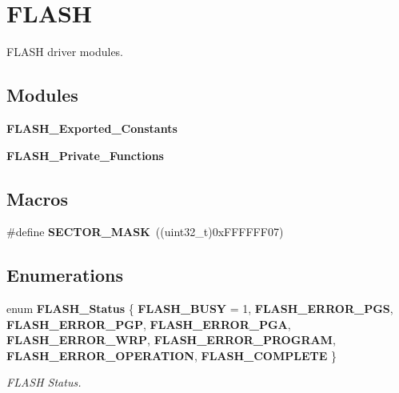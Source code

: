 \section{F\+L\+A\+SH}
\label{group__FLASH}


F\+L\+A\+SH driver modules.  


\subsection*{Modules}
\begin{DoxyCompactItemize}
\item 
\textbf{ F\+L\+A\+S\+H\+\_\+\+Exported\+\_\+\+Constants}
\item 
\textbf{ F\+L\+A\+S\+H\+\_\+\+Private\+\_\+\+Functions}
\end{DoxyCompactItemize}
\subsection*{Macros}
\begin{DoxyCompactItemize}
\item 
\#define \textbf{ S\+E\+C\+T\+O\+R\+\_\+\+M\+A\+SK}~((uint32\+\_\+t)0x\+F\+F\+F\+F\+F\+F07)
\end{DoxyCompactItemize}
\subsection*{Enumerations}
\begin{DoxyCompactItemize}
\item 
enum \textbf{ F\+L\+A\+S\+H\+\_\+\+Status} \{ \newline
\textbf{ F\+L\+A\+S\+H\+\_\+\+B\+U\+SY} = 1, 
\textbf{ F\+L\+A\+S\+H\+\_\+\+E\+R\+R\+O\+R\+\_\+\+P\+GS}, 
\textbf{ F\+L\+A\+S\+H\+\_\+\+E\+R\+R\+O\+R\+\_\+\+P\+GP}, 
\textbf{ F\+L\+A\+S\+H\+\_\+\+E\+R\+R\+O\+R\+\_\+\+P\+GA}, 
\newline
\textbf{ F\+L\+A\+S\+H\+\_\+\+E\+R\+R\+O\+R\+\_\+\+W\+RP}, 
\textbf{ F\+L\+A\+S\+H\+\_\+\+E\+R\+R\+O\+R\+\_\+\+P\+R\+O\+G\+R\+AM}, 
\textbf{ F\+L\+A\+S\+H\+\_\+\+E\+R\+R\+O\+R\+\_\+\+O\+P\+E\+R\+A\+T\+I\+ON}, 
\textbf{ F\+L\+A\+S\+H\+\_\+\+C\+O\+M\+P\+L\+E\+TE}
 \}\begin{DoxyCompactList}\small\item\em F\+L\+A\+SH Status. \end{DoxyCompactList}
\end{DoxyCompactItemize}
